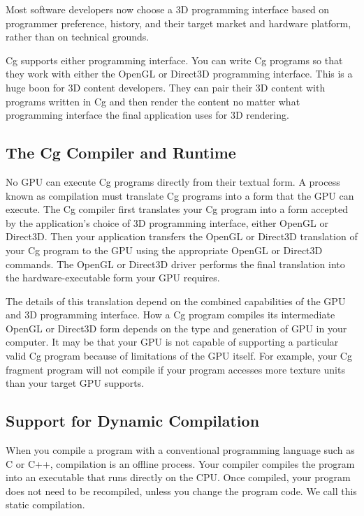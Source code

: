\documentclass{book}
\begin{document}
Most software developers now choose a 3D programming interface based on programmer preference, history, and their target market and hardware platform, rather than on technical grounds.

Cg supports either programming interface. You can write Cg programs so that they work with either the OpenGL or Direct3D programming interface. This is a huge boon for 3D content developers. They can pair their 3D content with programs written in Cg and then render the content no matter what programming interface the final application uses for 3D rendering.

\subsection{The Cg Compiler and Runtime}

No GPU can execute Cg programs directly from their textual form. A process known as compilation must translate Cg programs into a form that the GPU can execute. The Cg compiler first translates your Cg program into a form accepted by the application's choice of 3D programming interface, either OpenGL or Direct3D. Then your application transfers the OpenGL or Direct3D translation of your Cg program to the GPU using the appropriate OpenGL or Direct3D commands. The OpenGL or Direct3D driver performs the final translation into the hardware-executable form your GPU requires.

The details of this translation depend on the combined capabilities of the GPU and 3D programming interface. How a Cg program compiles its intermediate OpenGL or Direct3D form depends on the type and generation of GPU in your computer. It may be that your GPU is not capable of supporting a particular valid Cg program because of limitations of the GPU itself. For example, your Cg fragment program will not compile if your program accesses more texture units than your target GPU supports.

\subsection*{Support for Dynamic Compilation}

When you compile a program with a conventional programming language such as C or C++, compilation is an offline process. Your compiler compiles the program into an executable that runs directly on the CPU. Once compiled, your program does not need to be recompiled, unless you change the program code. We call this static compilation.
\end{document}
